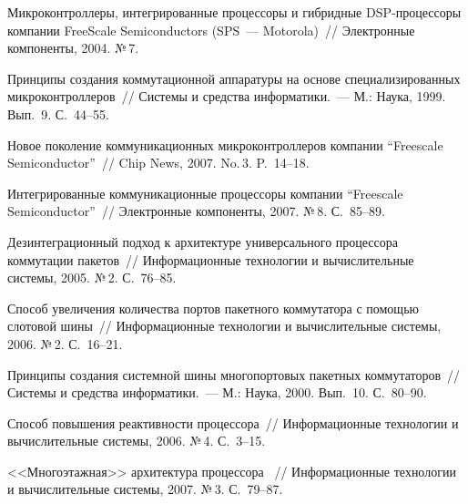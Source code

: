 \begin{multicols}{2}
{{\begin{thebibliography}{9}
Микроконтроллеры, интегрированные процессоры и гибридные DSP-процессоры компании
FreeScale Semiconductors (SPS~--- Motorola)~// Электронные компоненты, 2004. №\,7.

Принципы создания коммутационной аппаратуры на основе специализированных
микроконтроллеров~// Системы и средства информатики.~--- М.: Наука, 1999. Вып.~9.
С.~44--55.

Новое поколение коммуникационных мик\-ро\-контроллеров компании ``Freescale
Semi\-con\-ductor''~// Chip News, 2007. No.\,3. P.~14--18.

Интегрированные коммуникационные процессоры компании ``Freescale Semiconductor''~//
Электронные компоненты, 2007. №\,8. С.~85--89.

Дезинтеграционный подход к архитектуре универсального процессора коммутации пакетов~//
Информационные технологии и вычислительные системы, 2005. №\,2. С.~76--85.

 Способ увеличения количества портов пакетного коммутатора с помощью слотовой шины~//
Информационные технологии и вычислительные сис\-те\-мы, 2006. №\,2. С.~16--21.

Принципы создания сис\-тем\-ной шины многопортовых пакетных коммутаторов~// Сис\-те\-мы и
средства информатики.~--- М.: Наука, 2000. Вып.~10. С.~80--90.

Способ повышения реактивности процессора~// Информационные технологии и
вычислительные системы, 2006. №\,4. С.~3--15.

\label{end\stat}

<<Многоэтажная>> архитектура процессора~ // Информационные технологии и
вычислительные системы, 2007. №\,3. С.~79--87.
\end{thebibliography}
}
}
\end{multicols}